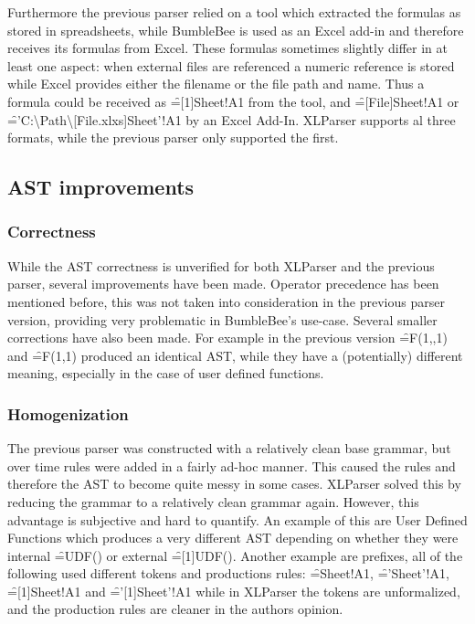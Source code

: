 Furthermore the previous parser relied on a tool which extracted the formulas as stored in spreadsheets, while BumbleBee is used as an Excel add-in and therefore receives its formulas from Excel.
These formulas sometimes slightly differ in at least one aspect: when external files are referenced a numeric reference is stored while Excel provides either the filename or the file path and name.
Thus a formula could be received as \f{=[1]Sheet!A1} from the tool, and \f{=[File]Sheet!A1} or \f{='C:\textbackslash Path\textbackslash [File.xlxs]Sheet'!A1} by an Excel Add-In.
XLParser supports al three formats, while the previous parser only supported the first.

\subsection{AST improvements}

\subsubsection{Correctness}

While the AST correctness is unverified for both XLParser and the previous parser, several improvements have been made.
Operator precedence has been mentioned before, this was not taken into consideration in the previous parser version, providing very problematic in BumbleBee's use-case.
Several smaller corrections have also been made.
For example in the previous version \f{=F(1,,1)} and \f{=F(1,1)} produced an identical AST, while they have a (potentially) different meaning, especially in the case of user defined functions.

\subsubsection{Homogenization}
The previous parser was constructed with a relatively clean base grammar, but over time rules were added in a fairly ad-hoc manner.
This caused the rules and therefore the AST to become quite messy in some cases.
XLParser solved this by reducing the grammar to a relatively clean grammar again.
However, this advantage is subjective and hard to quantify.
An example of this are User Defined Functions which produces a very different AST depending on whether they were internal \f{=UDF()} or external \f{=[1]UDF()}.
Another example are prefixes, all of the following used different tokens and productions rules: \f{=Sheet!A1}, \f{='Sheet'!A1}, \f{=[1]Sheet!A1} and \f{='[1]Sheet'!A1} while in XLParser the tokens are unformalized, and the production rules are cleaner in the authors opinion.


